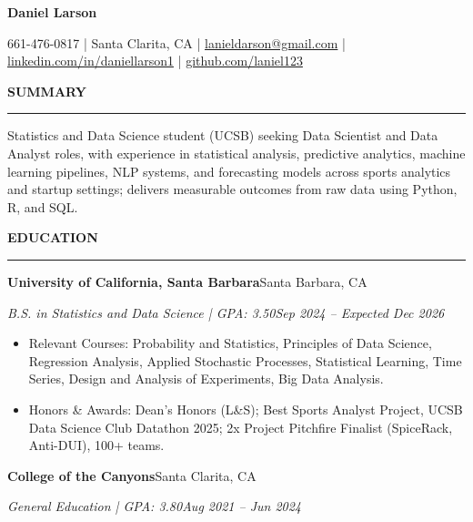 \documentclass[letterpaper,10pt]{article}
\newcommand{\resumeSection}[1]{%
  \vspace{3pt}%
  {\large\bfseries #1}\par
  \vspace{-4pt}\rule{\linewidth}{0.4pt}\par
  \vspace{1pt}%
}
\newcommand{\entry}[4]{%
  \textbf{#1}\hfill #2\par
  \textit{#3}\hfill \textit{#4}\par
}
\newenvironment{bullets}{\begin{itemize}}{\end{itemize}\vspace{1pt}}
\begin{document}
\begin{center}
  {\huge\bfseries Daniel Larson}\par
  \vspace{3pt}
  661-476-0817 | Santa Clarita, CA | \href{mailto:lanieldarson@gmail.com}{lanieldarson@gmail.com} |
  \href{https://www.linkedin.com/in/daniellarson1}{linkedin.com/in/daniellarson1} |
  \href{https://github.com/laniel123}{github.com/laniel123}
\end{center}

\resumeSection{SUMMARY}
Statistics and Data Science student (UCSB) seeking Data Scientist and Data Analyst roles, with experience in statistical analysis, predictive analytics, machine learning pipelines, NLP systems, and forecasting models across sports analytics and startup settings; delivers measurable outcomes from raw data using Python, R, and SQL.

\resumeSection{EDUCATION}
\entry{University of California, Santa Barbara}{Santa Barbara, CA}
      {B.S. in Statistics and Data Science | GPA: 3.50}{Sep 2024 -- Expected Dec 2026}
\begin{bullets}
  \item Relevant Courses: Probability and Statistics, Principles of Data Science, Regression Analysis, Applied Stochastic Processes, Statistical Learning, Time Series, Design and Analysis of Experiments, Big Data Analysis.
  \item Honors \& Awards: Dean's Honors (L\&S); Best Sports Analyst Project, UCSB Data Science Club Datathon 2025; 2x Project Pitchfire Finalist (SpiceRack, Anti-DUI), 100+ teams.
\end{bullets}
\entry{College of the Canyons}{Santa Clarita, CA}
      {General Education | GPA: 3.80}{Aug 2021 -- Jun 2024}
\end{document}

